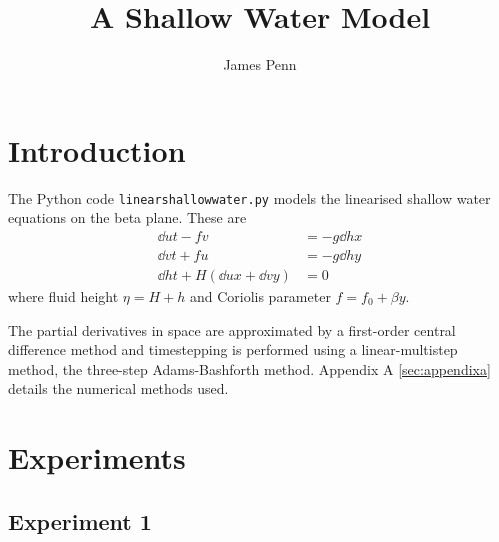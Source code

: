\documentclass[a4paper]{tufte-handout}
\author{James Penn}
\title{A Shallow Water Model}
\begin{document}
  \section{Introduction}
  \label{sec:Introduction}
  The Python code \texttt{linearshallowwater.py} models the linearised shallow
  water equations on the beta plane.
  These are
  \begin{align}
    \dd{u}{t} - fv &= - g \dd{h}{x} \\
    \dd{v}{t} + fu &= - g \dd{h}{y} \\
    \dd{h}{t} + H(\dd{u}{x} + \dd{v}{y}) &= 0
  \end{align}
  where fluid height $\eta = H + h$ and Coriolis parameter $f=f_0 + \beta y$.

  The partial derivatives in space are approximated by a first-order central
  difference method and timestepping is performed using a linear-multistep method,
  the three-step Adams-Bashforth method.
  Appendix A \ref{sec:appendixa} details the numerical methods used.

  \section{Experiments}
  \label{sec:Experiments}

  \subsection{Experiment 1}
  \label{sub:Experiment 1}
\end{document}
